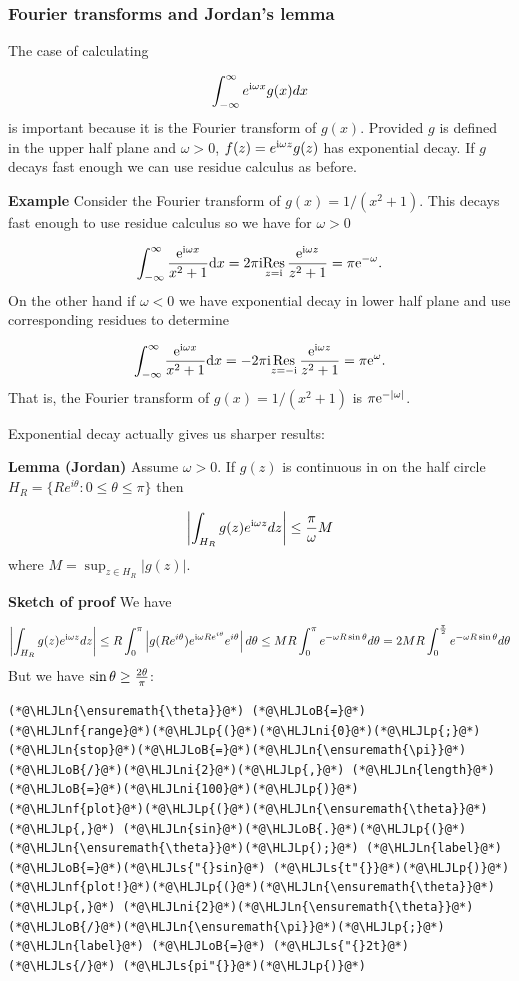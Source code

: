 \documentclass[12pt,a4paper]{article}
\newcommand{\HLJLn}[1]{#1}
\newcommand{\HLJLnf}[1]{\textcolor[RGB]{66,102,213}{#1}}
\newcommand{\HLJLs}[1]{\textcolor[RGB]{201,61,57}{#1}}
\newcommand{\HLJLni}[1]{\textcolor[RGB]{59,151,46}{#1}}
\newcommand{\HLJLoB}[1]{\textcolor[RGB]{102,102,102}{\textbf{#1}}}
\newcommand{\HLJLp}[1]{#1}
\def\D{ {\rm d} }
\def\I{ {\rm i} }
\def\E{ {\rm e} }
\def\Res_#1{\underset{#1}{\rm Res}\,}
\begin{document}
\subsubsection{Fourier transforms and Jordan's lemma}
The case of calculating

\[
    \int_{-\infty}^\infty e^{\I \omega x} g(x) dx
\]
is important because it is the Fourier transform of $g(x)$. Provided $g$ is defined in the upper half plane and $\omega > 0$,  $f(z) = e^{\I \omega z} g(z)$  has exponential decay. If $g$ decays fast enough we can use residue calculus as before. 

\textbf{Example} Consider the Fourier transform of $g(x) = 1/(x^2+1)$. This decays fast enough to use residue calculus so we have for $\omega > 0$

\[
\int_{-\infty}^\infty {\E^{\I \omega x } \over x^2 + 1} \D x = 2 \pi \I \Res_{z = \I} {\E^{\I \omega z } \over z^2 + 1} = \pi \E^{-\omega}.
\]
On the other hand if $\omega < 0$ we have exponential decay in lower half plane and use corresponding residues to determine

\[
\int_{-\infty}^\infty {\E^{\I \omega x } \over x^2 + 1} \D x = -2 \pi \I \Res_{z = -\I} {\E^{\I \omega z } \over z^2 + 1} = \pi \E^{\omega}.
\]
That is, the Fourier transform of $g(x) = 1/(x^2+1)$ is $\pi \E^{-|\omega|}$. 

Exponential decay actually gives us  sharper results:

\textbf{Lemma (Jordan)} Assume $\omega > 0$. If $g(z)$ is continuous in on the half circle $H_R = \{ R e^{i \theta} : 0 \leq \theta \leq \pi \}$  then

\[
\left| \int_{H_R} g(z) e^{\I \omega z} dz \right| \leq {\pi \over \omega} M
\]
where $M = \sup_{z \in H_R} |g(z)|$. 

\textbf{Sketch of proof} We have

\[
\left| \int_{H_R} g(z) e^{\I \omega z} dz \right|  \leq   R \int_0^\pi \left|g(R e^{i \theta}) e^{\I \omega R e^{i \theta}}e^{i \theta}\right| d\theta 
\leq MR \int_0^\pi e^{- \omega R\sin \theta } d\theta 
= 2MR \int_0^{\pi\over 2} e^{- \omega R\sin \theta } d\theta 
\]
But we have $\sin \theta \geq {2 \theta \over \pi}$:


\begin{lstlisting}
(*@\HLJLn{\ensuremath{\theta}}@*) (*@\HLJLoB{=}@*) (*@\HLJLnf{range}@*)(*@\HLJLp{(}@*)(*@\HLJLni{0}@*)(*@\HLJLp{;}@*) (*@\HLJLn{stop}@*)(*@\HLJLoB{=}@*)(*@\HLJLn{\ensuremath{\pi}}@*)(*@\HLJLoB{/}@*)(*@\HLJLni{2}@*)(*@\HLJLp{,}@*) (*@\HLJLn{length}@*)(*@\HLJLoB{=}@*)(*@\HLJLni{100}@*)(*@\HLJLp{)}@*)
(*@\HLJLnf{plot}@*)(*@\HLJLp{(}@*)(*@\HLJLn{\ensuremath{\theta}}@*)(*@\HLJLp{,}@*) (*@\HLJLn{sin}@*)(*@\HLJLoB{.}@*)(*@\HLJLp{(}@*)(*@\HLJLn{\ensuremath{\theta}}@*)(*@\HLJLp{);}@*) (*@\HLJLn{label}@*)(*@\HLJLoB{=}@*)(*@\HLJLs{"{}sin}@*) (*@\HLJLs{t"{}}@*)(*@\HLJLp{)}@*)
(*@\HLJLnf{plot!}@*)(*@\HLJLp{(}@*)(*@\HLJLn{\ensuremath{\theta}}@*)(*@\HLJLp{,}@*) (*@\HLJLni{2}@*)(*@\HLJLn{\ensuremath{\theta}}@*)(*@\HLJLoB{/}@*)(*@\HLJLn{\ensuremath{\pi}}@*)(*@\HLJLp{;}@*) (*@\HLJLn{label}@*) (*@\HLJLoB{=}@*) (*@\HLJLs{"{}2t}@*) (*@\HLJLs{/}@*) (*@\HLJLs{pi"{}}@*)(*@\HLJLp{)}@*)
\end{lstlisting}
\end{document}
